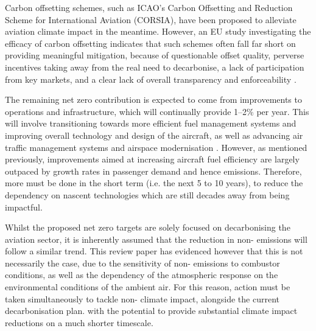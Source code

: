 Carbon offsetting schemes, such as ICAO's Carbon Offsetting and Reduction Scheme for International Aviation (CORSIA), have been proposed to alleviate aviation climate impact in the meantime. However, an EU study investigating the efficacy of carbon offsetting indicates that such schemes often fall far short on providing meaningful mitigation, because of questionable offset quality, perverse incentives taking away from the real need to decarbonise, a lack of participation from key markets, and a clear lack of overall transparency and enforceability \cite{TandE2021, TandE2020}.

The remaining net zero contribution is expected to come from improvements to operations and infrastructure, which will continually provide 1--2\% per year. This will involve transitioning towards more efficient fuel management systems and improving overall technology and design of the aircraft, as well as advancing air traffic management systems and airspace modernisation \cite{Peeters2016}. However, as mentioned previously, improvements aimed at increasing aircraft fuel efficiency are largely outpaced by growth rates in passenger demand and hence emissions. Therefore, more must be done in the short term (i.e. the next 5 to 10 years), to reduce the dependency on nascent technologies which are still decades away from being impactful.

Whilst the proposed net zero targets are solely focused on decarbonising the aviation sector, it is inherently assumed that the reduction in non- emissions will follow a similar trend. This review paper has evidenced however that this is not necessarily the case, due to the sensitivity of non- emissions to combustor conditions, as well as the dependency of the atmospheric response on the environmental conditions of the ambient air. For this reason, action must be taken simultaneously to tackle non- climate impact, alongside the current decarbonisation plan. with the potential to provide substantial climate impact reductions on a much shorter timescale.




